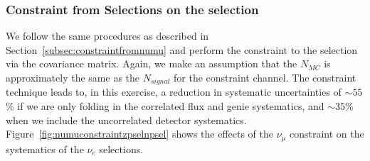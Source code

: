 \subsubsection{Constraint from \numu Selections on the \zpsel selection}
\label{subsec:zpselconstraint}

\par We follow the same procedures as described in Section~\ref{subsec:constraintfromnumu} and perform the
\numu constraint to the \zpsel selection via the covariance matrix. Again, we make an assumption that the $N_{MC}$ is approximately the same as the $N_{signal}$ for the \numu constraint channel. The constraint technique leads to, in this exercise, a reduction in systematic uncertainties of $\sim55$\% if we are only folding in the correlated flux and genie systematics, and $\sim35$\% when we include the uncorrelated detector systematics.
Figure~\ref{fig:numuconstraintzpselnpsel} shows the effects of the $\nu_\mu$ constraint on the systematics of the \zpsel $\nu_e$ selections.

